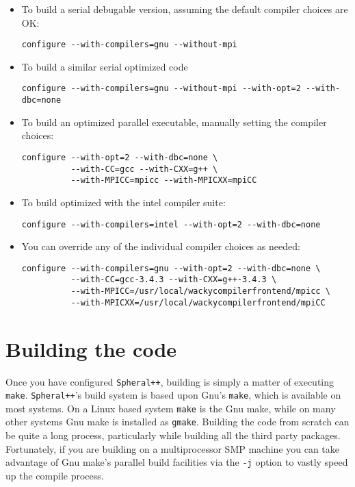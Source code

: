 \documentclass{article}
\newcommand{\Spheral}{{\tt Spheral++}}
\begin{document}
\begin{itemize}
\item To build a serial debugable version, assuming the default compiler choices are OK:
\begin{verbatim}
configure --with-compilers=gnu --without-mpi
\end{verbatim}

\item To build a similar serial optimized code
\begin{verbatim}
configure --with-compilers=gnu --without-mpi --with-opt=2 --with-dbc=none
\end{verbatim}

\item To build an optimized parallel executable, manually setting the compiler choices:
\begin{verbatim}
configure --with-opt=2 --with-dbc=none \
          --with-CC=gcc --with-CXX=g++ \
          --with-MPICC=mpicc --with-MPICXX=mpiCC
\end{verbatim}

\item To build optimized with the intel compiler suite:
\begin{verbatim}
configure --with-compilers=intel --with-opt=2 --with-dbc=none
\end{verbatim}

\item You can override any of the individual compiler choices as needed:
\begin{verbatim}
configure --with-compilers=gnu --with-opt=2 --with-dbc=none \ 
          --with-CC=gcc-3.4.3 --with-CXX=g++-3.4.3 \ 
          --with-MPICC=/usr/local/wackycompilerfrontend/mpicc \ 
          --with-MPICXX=/usr/local/wackycompilerfrontend/mpiCC
\end{verbatim}

\end{itemize}

\section{Building the code}

Once you have configured \Spheral, building is simply a matter of executing {\tt make}.  \Spheral's build system is based upon Gnu's \verb+make+, which is available on most systems.  On a Linux based system \verb+make+ is the Gnu make, while on many other systems Gnu make is installed as \verb+gmake+.  Building the code from scratch can be quite a long process, particularly while building all the third party packages.  Fortunately, if you are building on a multiprocessor SMP machine you can take advantage of Gnu make's parallel build facilities via the \verb+-j+ option to vastly speed up the compile process.
\end{document}
